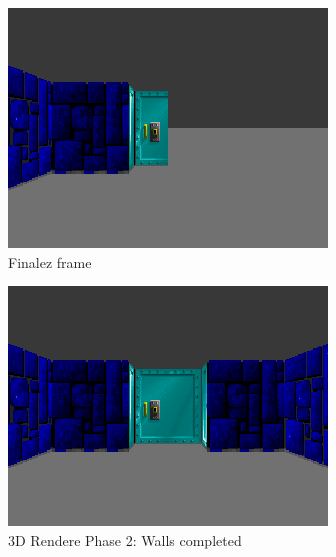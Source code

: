 \begin{figure}[H]
 \centering
  \includegraphics[width=\textwidth]{screenshots/wolf3d_5_partialwalls_160rays.png}
 \caption{Finalez frame} 
 
\end{figure}
 
 
 \begin{figure}[H]
\centering
 \includegraphics[width=\textwidth]{screenshots/wolf4d_2_walls.png}
 \caption{3D Rendere Phase 2: Walls completed} 
 \end{figure}
 
